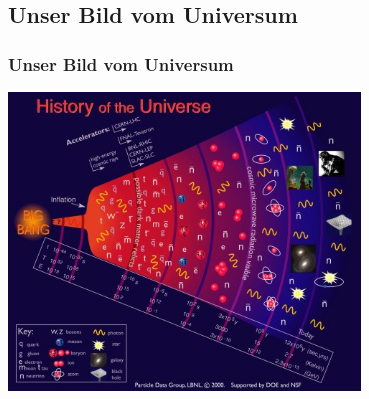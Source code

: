 \documentclass{beamer}
\begin{document}
{\begin{frame}[t]
{\begin{columns}
\begin{column}{0.4\textwidth}
        \end{column}
      \end{columns}
    }
  \end{frame}
 
  \subsection{Unser Bild vom Universum}
   \begin{frame}
     \frametitle{Unser Bild vom Universum}
     \begin{center}
       \includegraphics[width=0.7\textwidth]{cosmology/EvolutionOfTheUniverse5.jpg}
     \end{center}
   \end{frame}
   
}
\end{document}
